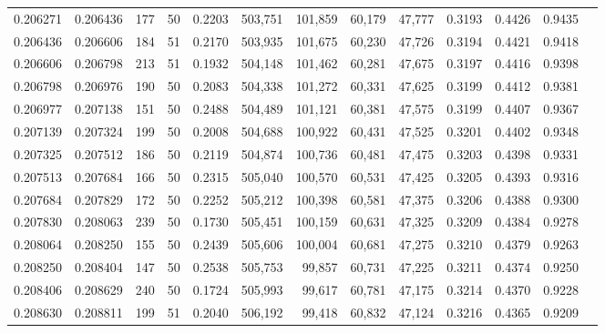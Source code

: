 \begin{tabular}{rrrrrrrrrrrrr}
0.206271 & 0.206436 &   177 &  50 &                                     0.2203 & 503,751 & 101,859 &  60,179 &  47,777 & 0.3193 & 0.4426 & 0.9435 \\
0.206436 & 0.206606 &   184 &  51 &                                     0.2170 & 503,935 & 101,675 &  60,230 &  47,726 & 0.3194 & 0.4421 & 0.9418 \\
0.206606 & 0.206798 &   213 &  51 &                                     0.1932 & 504,148 & 101,462 &  60,281 &  47,675 & 0.3197 & 0.4416 & 0.9398 \\
0.206798 & 0.206976 &   190 &  50 &                                     0.2083 & 504,338 & 101,272 &  60,331 &  47,625 & 0.3199 & 0.4412 & 0.9381 \\
0.206977 & 0.207138 &   151 &  50 &                                     0.2488 & 504,489 & 101,121 &  60,381 &  47,575 & 0.3199 & 0.4407 & 0.9367 \\
0.207139 & 0.207324 &   199 &  50 &                                     0.2008 & 504,688 & 100,922 &  60,431 &  47,525 & 0.3201 & 0.4402 & 0.9348 \\
0.207325 & 0.207512 &   186 &  50 &                                     0.2119 & 504,874 & 100,736 &  60,481 &  47,475 & 0.3203 & 0.4398 & 0.9331 \\
0.207513 & 0.207684 &   166 &  50 &                                     0.2315 & 505,040 & 100,570 &  60,531 &  47,425 & 0.3205 & 0.4393 & 0.9316 \\
0.207684 & 0.207829 &   172 &  50 &                                     0.2252 & 505,212 & 100,398 &  60,581 &  47,375 & 0.3206 & 0.4388 & 0.9300 \\
0.207830 & 0.208063 &   239 &  50 &                                     0.1730 & 505,451 & 100,159 &  60,631 &  47,325 & 0.3209 & 0.4384 & 0.9278 \\
0.208064 & 0.208250 &   155 &  50 &                                     0.2439 & 505,606 & 100,004 &  60,681 &  47,275 & 0.3210 & 0.4379 & 0.9263 \\
0.208250 & 0.208404 &   147 &  50 &                                     0.2538 & 505,753 &  99,857 &  60,731 &  47,225 & 0.3211 & 0.4374 & 0.9250 \\
0.208406 & 0.208629 &   240 &  50 &                                     0.1724 & 505,993 &  99,617 &  60,781 &  47,175 & 0.3214 & 0.4370 & 0.9228 \\
0.208630 & 0.208811 &   199 &  51 &                                     0.2040 & 506,192 &  99,418 &  60,832 &  47,124 & 0.3216 & 0.4365 & 0.9209 \\

\end{tabular}
